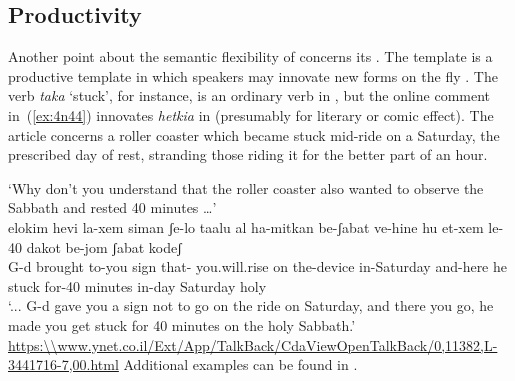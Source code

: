 \begin{exe}
\begin{xlist}
\begin{xlist}
\begin{exe}
\begin{exe}
\begin{xlist}
\begin{exe}
\begin{xlist}
\begin{exe}
\begin{xlist}
\begin{xlist}
\begin{exe}
\begin{xlist}
\begin{exe}
\begin{xlist}
\begin{exe}
\begin{exe}
\begin{exe}
\begin{xlist}
\begin{exe}
\begin{exe}
\begin{xlist}
\begin{xlist}
\begin{exe}
\begin{xlist}
\begin{exe}
\begin{exe}
\begin{exe}
\begin{xlist}
\begin{exe}
\begin{exe}
\begin{xlist}
\begin{exe}
\begin{xlist}
\begin{exe}
\begin{xlist}
\begin{exe}
\begin{xlist}
\begin{exe}
\begin{exe}
\begin{xlist}
\begin{exe}
\begin{exe}
\begin{xlist}
\begin{xlist}
\begin{exe}
\begin{xlist}
\begin{xlist}
\begin{exe}
\begin{xlist}
\begin{exe}
\begin{xlist}
\begin{exe}
\begin{xlist}
\begin{exe}
\begin{xlist}
\begin{exe}
\begin{exe}
\begin{exe}
\begin{exe}
\begin{xlist}
	\subsection{Productivity} \label{vd:caus:product}
Another point about the semantic flexibility of {\vd} concerns its . The template {\thif} is a productive  template in which speakers may innovate new forms on the fly \citep{lev16}. The verb \emph{taka} `stuck', for instance, is an ordinary  verb in {\tkal}, but the online comment in~(\ref{ex:4n44}) innovates \emph{hetkia} in {\thif} (presumably for literary or comic effect). The article concerns a roller coaster which became stuck mid-ride on a Saturday, the prescribed day of rest, stranding those riding it for the better part of an hour.
 \begin{exe}
\ex  \label{ex:4n44}`Why don't you understand that the roller coaster also wanted to observe the Sabbath and rested 40 minutes {\dots}'  \\
	{  elokim hevi la-xem siman ʃe-lo taalu al ha-mitkan be-ʃabat ve-hine hu  et-xem le-40 dakot be-jom ʃabat kodeʃ\\
 	  {} G-d brought to-you sign that- you.will.rise on the-device in-Saturday and-here he stuck  for-40 minutes in-day Saturday holy\\
 	\glt `{...} G-d gave you a sign not to go on the ride on Saturday, and there you go, he made you get stuck for 40 minutes on the holy Sabbath.' \hfill \url{https:\\www.ynet.co.il/Ext/App/TalkBack/CdaViewOpenTalkBack/0,11382,L-3441716-7,00.html} } 		
 \z 
Additional examples can be found in \cite{lev16}.


\end{exe}
\end{xlist}
\end{exe}
\end{exe}
\end{exe}
\end{exe}
\end{xlist}
\end{exe}
\end{xlist}
\end{exe}
\end{xlist}
\end{exe}
\end{xlist}
\end{exe}
\end{xlist}
\end{xlist}
\end{exe}
\end{xlist}
\end{xlist}
\end{exe}
\end{exe}
\end{xlist}
\end{exe}
\end{exe}
\end{xlist}
\end{exe}
\end{xlist}
\end{exe}
\end{xlist}
\end{exe}
\end{xlist}
\end{exe}
\end{exe}
\end{xlist}
\end{exe}
\end{exe}
\end{exe}
\end{xlist}
\end{exe}
\end{xlist}
\end{xlist}
\end{exe}
\end{exe}
\end{xlist}
\end{exe}
\end{exe}
\end{exe}
\end{xlist}
\end{exe}
\end{xlist}
\end{exe}
\end{xlist}
\end{xlist}
\end{exe}
\end{xlist}
\end{exe}
\end{xlist}
\end{exe}
\end{exe}
\end{xlist}
\end{xlist}
\end{exe}
